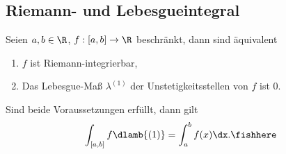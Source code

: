 \subsection{Riemann- und Lebesgueintegral}
\begin{prop}
\label{prop:3.44}
Seien $a,b\in\R$, $f:[a,b]\to\R$ beschränkt, dann sind äquivalent
\begin{enumerate}[label=(\roman{*})]
  \item $f$ ist Riemann-integrierbar,
  \item Das Lebesgue-Maß $\lambda^{(1)}$ der Unstetigkeitsstellen von $f$ ist 0.
\end{enumerate}
Sind beide Voraussetzungen erfüllt, dann gilt
\begin{align*}
\int_{[a,b]} f\dlamb{(1)} =\int_a^b f(x)\dx.\fishhere
\end{align*}
\end{prop}
